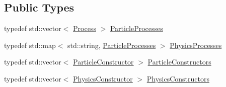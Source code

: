 \subsection*{Public Types}
\begin{DoxyCompactItemize}
\item 
typedef std::vector$<$ \hyperlink{class_d_d4hep_1_1_simulation_1_1_geant4_physics_list_1_1_process}{Process} $>$ \hyperlink{class_d_d4hep_1_1_simulation_1_1_geant4_physics_list_adf5c4ae6ed4befac883cf5f253f4220e}{ParticleProcesses}
\item 
typedef std::map$<$ std::string, \hyperlink{class_d_d4hep_1_1_simulation_1_1_geant4_physics_list_adf5c4ae6ed4befac883cf5f253f4220e}{ParticleProcesses} $>$ \hyperlink{class_d_d4hep_1_1_simulation_1_1_geant4_physics_list_ab41e55687c9d57878fe2e6847a31f19a}{PhysicsProcesses}
\item 
typedef std::vector$<$ \hyperlink{class_d_d4hep_1_1_simulation_1_1_geant4_physics_list_1_1_particle_constructor}{ParticleConstructor} $>$ \hyperlink{class_d_d4hep_1_1_simulation_1_1_geant4_physics_list_afaee3763aea79b299830be37f9642342}{ParticleConstructors}
\item 
typedef std::vector$<$ \hyperlink{class_d_d4hep_1_1_simulation_1_1_geant4_physics_list_1_1_physics_constructor}{PhysicsConstructor} $>$ \hyperlink{class_d_d4hep_1_1_simulation_1_1_geant4_physics_list_a5953826b626c21fa4b26ab9a07f3b8ad}{PhysicsConstructors}
\end{DoxyCompactItemize}
